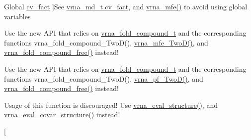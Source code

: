 \begin{DoxyRefList}
Global \hyperlink{group__consensus__fold_gaf3cbac6ff5d706d6e414677841ddf94c}{cv\+\_\+fact} ]See \hyperlink{group__model__details_a62ebefb9d0643e5c4c8a2ec84a105ce6}{vrna\+\_\+md\+\_\+t.\+cv\+\_\+fact}, and \hyperlink{group__mfe__fold_gabd3b147371ccf25c577f88bbbaf159fd}{vrna\+\_\+mfe()} to avoid using global variables 
\item[\label{deprecated__deprecated000003}%
\hypertarget{deprecated__deprecated000003}{}%
Global \hyperlink{group__kl__neighborhood__mfe_ga05bf4f31d216b1b160fd2d3d68e9b487}{destroy\+\_\+\+Two\+Dfold\+\_\+variables} (\hyperlink{group__kl__neighborhood__mfe_structTwoDfold__vars}{Two\+Dfold\+\_\+vars} $\ast$our\+\_\+variables)]Use the new A\+P\+I that relies on \hyperlink{group__fold__compound_ga1b0cef17fd40466cef5968eaeeff6166}{vrna\+\_\+fold\+\_\+compound\+\_\+t} and the corresponding functions vrna\+\_\+fold\+\_\+compound\+\_\+\+Two\+D(), \hyperlink{group__kl__neighborhood__mfe_ga243c288b463147352829df04de6a2f77}{vrna\+\_\+mfe\+\_\+\+Two\+D()}, and \hyperlink{group__fold__compound_gadded6039d63f5d6509836e20321534ad}{vrna\+\_\+fold\+\_\+compound\+\_\+free()} instead! 
\item[\label{deprecated__deprecated000008}%
\hypertarget{deprecated__deprecated000008}{}%
Global \hyperlink{2Dpfold_8h_afe994291458ee2ac34d3eb825ef62a15}{destroy\+\_\+\+Two\+Dpfold\+\_\+variables} (\hyperlink{structTwoDpfold__vars}{Two\+Dpfold\+\_\+vars} $\ast$vars)]Use the new A\+P\+I that relies on \hyperlink{group__fold__compound_ga1b0cef17fd40466cef5968eaeeff6166}{vrna\+\_\+fold\+\_\+compound\+\_\+t} and the corresponding functions vrna\+\_\+fold\+\_\+compound\+\_\+\+Two\+D(), \hyperlink{group__kl__neighborhood__pf_ga0bc3427689bd09da09b8b3094a27f836}{vrna\+\_\+pf\+\_\+\+Two\+D()}, and \hyperlink{group__fold__compound_gadded6039d63f5d6509836e20321534ad}{vrna\+\_\+fold\+\_\+compound\+\_\+free()} instead! 
\item[\label{deprecated__deprecated000015}%
\hypertarget{deprecated__deprecated000015}{}%
Global \hyperlink{group__consensus__fold_ga1c48869c03b49a342bf4cbdd61900081}{energy\+\_\+of\+\_\+alistruct} (const char $\ast$$\ast$sequences, const char $\ast$structure, int n\+\_\+seq, float $\ast$energy)]Usage of this function is discouraged! Use \hyperlink{group__eval_ga58f199f1438d794a265f3b27fc8ea631}{vrna\+\_\+eval\+\_\+structure()}, and \hyperlink{group__eval_ga6cea75c0eb9857fb59172be54cab09e0}{vrna\+\_\+eval\+\_\+covar\+\_\+structure()} instead! 
\item[\label{deprecated__deprecated000060}%
\hypertarget{deprecated__deprecated000060}{}%
$$
\end{DoxyRefList}
